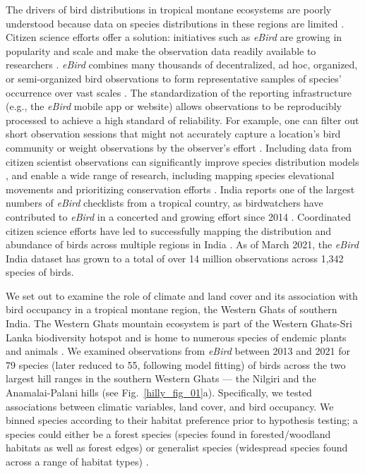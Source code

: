 The drivers of bird distributions in tropical montane ecosystems are poorly understood because data on species distributions in these regions are limited \citep{payne2017,peters2019}.
Citizen science efforts offer a solution: initiatives such as \textit{eBird} are growing in popularity and scale and make the observation data readily available to researchers \citep{sullivan2014}.
\textit{eBird} combines many thousands of decentralized, ad hoc, organized, or semi-organized bird observations to form representative samples of species' occurrence over vast scales \citep{sullivan2009,sullivan2014,wood2011a}.
The standardization of the reporting infrastructure (e.g., the \textit{eBird} mobile app or website) allows observations to be reproducibly processed to achieve a high standard of reliability.
For example, one can filter out short observation sessions that might not accurately capture a location's bird community or weight observations by the observer's effort \citep{kelling2015a,johnston2018,johnston2021}.
Including data from citizen scientist observations can significantly improve species distribution models \citep{robinson2020}, and enable a wide range of research, including mapping species elevational movements \citep{tsai2020} and prioritizing conservation efforts \citep{vanstrien2013,fink2014,johnston2015}.
India reports one of the largest numbers of \textit{eBird} checklists from a tropical country, as birdwatchers have contributed to \textit{eBird} in a concerted and growing effort since 2014 \citep{viswanathan2020}.
Coordinated citizen science efforts have led to successfully mapping the distribution and abundance of birds across multiple regions in India \citep[e.g. the Mysore Bird Atlas, and the Kerala Bird Atlas][]{praveenj2021}.
As of March 2021, the \textit{eBird} India dataset has grown to a total of over 14 million observations across 1,342 species of birds.

We set out to examine the role of climate and land cover and its association with bird occupancy in a tropical montane region, the Western Ghats of southern India.
The Western Ghats mountain ecosystem is part of the Western Ghats-Sri Lanka biodiversity hotspot and is home to numerous species of endemic plants and animals \citep{myers2000,das2006}.
We examined observations from \textit{eBird} between 2013 and 2021 for 79 species (later reduced to 55, following model fitting) of birds across the two largest hill ranges in the southern Western Ghats --- the Nilgiri and the Anamalai-Palani hills (see Fig.~\ref{hilly_fig_01}a).
Specifically, we tested associations between climatic variables, land cover, and bird occupancy.
We binned species according to their habitat preference prior to hypothesis testing; a species could either be a forest species (species found in forested/woodland habitats as well as forest edges) or generalist species (widespread species found across a range of habitat types) \citep{ali1983}.

